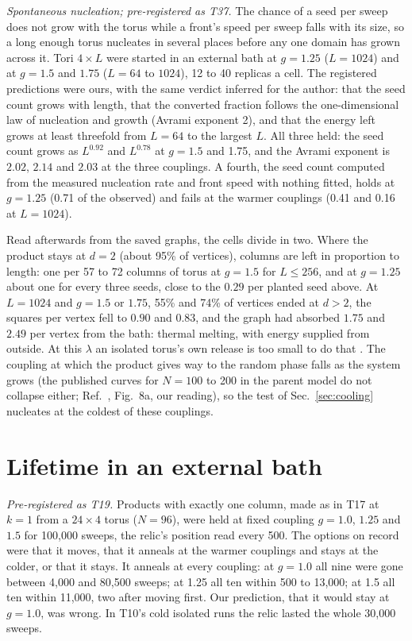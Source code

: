 \documentclass[aps,pre,10pt,twocolumn,superscriptaddress,nofootinbib]{revtex4-2}
\begin{document}
\emph{Spontaneous nucleation; pre-registered as T37.} The chance of a seed per sweep does not grow with the
torus while a front's speed per sweep falls with its size, so a long enough torus nucleates in several places
before any one domain has grown across it. Tori $4 \times L$ were started in an external bath at $g = 1.25$
($L = 1024$) and at $g = 1.5$ and $1.75$ ($L = 64$ to $1024$), 12 to 40 replicas a cell. The registered
predictions were ours, with the same verdict inferred for the author: that the seed count grows with length,
that the converted fraction follows the one-dimensional law of nucleation and growth \cite{KJMA} (Avrami
exponent 2), and that the energy left grows at least threefold from $L = 64$ to the largest $L$. All three held:
the seed count grows as $L^{0.92}$ and $L^{0.78}$ at $g = 1.5$ and 1.75, and the Avrami exponent is $2.02$,
$2.14$ and $2.03$ at the three couplings. A fourth, the seed count computed from the measured nucleation rate
and front speed with nothing fitted, holds at $g = 1.25$ (0.71 of the observed) and fails at the warmer
couplings (0.41 and 0.16 at $L = 1024$).

Read afterwards from the saved graphs, the cells divide in two. Where the product stays at $d = 2$ (about 95\%
of vertices), columns are left in proportion to length: one per 57 to 72 columns of torus at $g = 1.5$ for
$L \le 256$, and at $g = 1.25$ about one for every three seeds, close to the $0.29$ per planted seed above. At
$L = 1024$ and $g = 1.5$ or $1.75$, 55\% and 74\% of vertices ended at $d > 2$, the squares per vertex fell to
$0.90$ and $0.83$, and the graph had absorbed $1.75$ and $2.49$ per vertex from the bath: thermal melting, with
energy supplied from outside. At this $\lambda$ an isolated torus's own release is too small to do that
\cite{paper1}. The coupling at which the product gives way to the random phase falls as the system grows
(the published curves for $N = 100$ to 200 in the parent model do not collapse either; Ref.~\cite{KTB19},
Fig.~8a, our reading), so the test of Sec.~\ref{sec:cooling} nucleates at the coldest of these couplings.

\section{Lifetime in an external bath}
\label{sec:lifetime}

\emph{Pre-registered as T19.} Products with exactly one column, made as in T17 at $k = 1$ from a $24 \times 4$
torus ($N = 96$), were held at fixed coupling $g = 1.0$, $1.25$ and $1.5$ for 100,000 sweeps, the relic's
position read every 500. The options on record were that it moves, that it anneals at the warmer couplings and
stays at the colder, or that it stays. It anneals at every coupling: at $g = 1.0$ all nine were gone between
4,000 and 80,500 sweeps; at 1.25 all ten within 500 to 13,000; at 1.5 all ten within 11,000, two after moving
first. Our prediction, that it would stay at $g = 1.0$, was wrong. In T10's cold isolated runs the relic lasted
the whole 30,000 sweeps.
\end{document}
